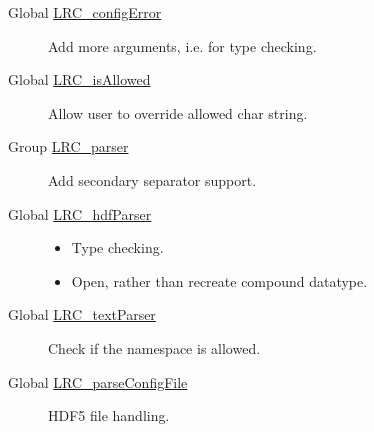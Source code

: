 \label{todo__todo000001}
\hypertarget{todo__todo000001}{}
 \begin{description}
\item[Global \hyperlink{group___l_r_c__internals_g0768167abe6a143840f26439a86ec79d}{LRC\_\-configError} ]Add more arguments, i.e. for type checking.

\end{description}


\label{todo__todo000002}
\hypertarget{todo__todo000002}{}
 \begin{description}
\item[Global \hyperlink{group___l_r_c__internals_g6ac7bc617b346047519f4c3589a311bd}{LRC\_\-isAllowed} ]Allow user to override allowed char string. \end{description}


\label{todo__todo000003}
\hypertarget{todo__todo000003}{}
 \begin{description}
\item[Group \hyperlink{group___l_r_c__parser}{LRC\_\-parser} ]Add secondary separator support. \end{description}


\label{todo__todo000005}
\hypertarget{todo__todo000005}{}
 \begin{description}
\item[Global \hyperlink{group___l_r_c__parser_g3cbf6e172a98da00ec8fd0b301b4b8f9}{LRC\_\-hdfParser} ]\begin{itemize}
\item Type checking.\item Open, rather than recreate compound datatype.\end{itemize}


\end{description}


\label{todo__todo000004}
\hypertarget{todo__todo000004}{}
 \begin{description}
\item[Global \hyperlink{group___l_r_c__parser_g4b1c98d54591fd4d05cc1caee09cbd35}{LRC\_\-textParser} ]Check if the namespace is allowed. \end{description}


\label{todo__todo000008}
\hypertarget{todo__todo000008}{}
 \begin{description}
\item[Global \hyperlink{group___l_r_c__wrappers_g98adf1a77ae325830d4521b691ca33b0}{LRC\_\-parseConfigFile} ]HDF5 file handling. \end{description}


